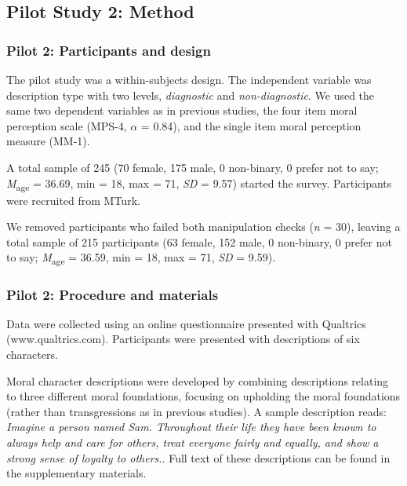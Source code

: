 \documentclass[
  english,
  man,floatsintext]{apa7}
\begin{document}
\hypertarget{pilot-study-2-method}{%
\subsection{Pilot Study 2: Method}\label{pilot-study-2-method}}

\hypertarget{pilot-2-participants-and-design}{%
\subsubsection{Pilot 2: Participants and design}\label{pilot-2-participants-and-design}}

The pilot study was a within-subjects design. The independent variable was description type with two levels, \emph{diagnostic} and \emph{non-diagnostic}. We used the same two dependent variables as in previous studies, the four item moral perception scale (MPS-4, \(\alpha\) = 0.84), and the single item moral perception measure (MM-1).

A total sample of 245 (70 female, 175 male, 0 non-binary, 0 prefer not to say; \emph{M}\textsubscript{age} = 36.69, min = 18, max = 71, \emph{SD} = 9.57) started the survey. Participants were recruited from MTurk.

We removed participants who failed both manipulation checks (\emph{n} = 30), leaving a total sample of 215 participants (63 female, 152 male, 0 non-binary, 0 prefer not to say; \emph{M}\textsubscript{age} = 36.59, min = 18, max = 71, \emph{SD} = 9.59).

\hypertarget{pilot-2-procedure-and-materials}{%
\subsubsection{Pilot 2: Procedure and materials}\label{pilot-2-procedure-and-materials}}

Data were collected using an online questionnaire presented with Qualtrics (www.qualtrics.com). Participants were presented with descriptions of six characters.

Moral character descriptions were developed by combining descriptions relating to three different moral foundations, focusing on upholding the moral foundations (rather than transgressions as in previous studies). A sample description reads: \emph{Imagine a person named Sam. Throughout their life they have been known to always help and care for others, treat everyone fairly and equally, and show a strong sense of loyalty to others.}. Full text of these descriptions can be found in the supplementary materials.
\end{document}
